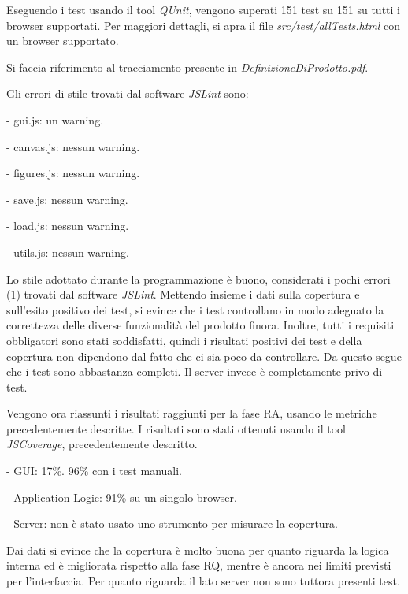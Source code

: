 Eseguendo i test usando il tool \textit{QUnit}, vengono superati 151 test su 151 su tutti i browser supportati. Per maggiori dettagli, si apra il file \textit{src/test/allTests.html} con un browser supportato.

Si faccia riferimento al tracciamento presente in \textit{DefinizioneDiProdotto.pdf}.

Gli errori di stile trovati dal software \textit{JSLint} sono:
\begin{elencopuntato}[\subsubsecindent]
\item[-] gui.js: un warning.
\item[-] canvas.js: nessun warning.
\item[-] figures.js: nessun warning.
\item[-] save.js: nessun warning.
\item[-] load.js: nessun warning.
\item[-] utils.js: nessun warning.
\end{elencopuntato}

 Lo stile adottato durante la programmazione \`e buono, considerati i pochi errori (1) trovati dal software \textit{JSLint}. Mettendo insieme i dati sulla copertura e sull'esito positivo dei test, si evince che i test controllano in modo adeguato la correttezza delle diverse funzionalit\`a del prodotto finora. Inoltre, tutti i requisiti obbligatori sono stati soddisfatti, quindi i risultati positivi dei test e della copertura non dipendono dal fatto che ci sia poco da controllare. Da questo segue che i test sono abbastanza completi. Il server invece \`e completamente privo di test. 

Vengono ora riassunti i risultati raggiunti per la fase RA, usando le metriche precedentemente descritte.
I risultati sono stati ottenuti usando il tool \textit{JSCoverage}, precedentemente descritto.
\begin{elencopuntato}[\subsubsecindent]
\item[-] GUI: 17\%. 96\% con i test manuali.
\item[-] Application Logic: 91\% su un singolo browser.
\item[-] Server: non \`e stato usato uno strumento per misurare la copertura.
\end{elencopuntato}
Dai dati si evince che la copertura \`e molto buona per quanto riguarda la logica interna ed \`e migliorata rispetto alla fase RQ, mentre \`e ancora nei limiti previsti per l'interfaccia. Per quanto riguarda il lato server non sono tuttora presenti test.

